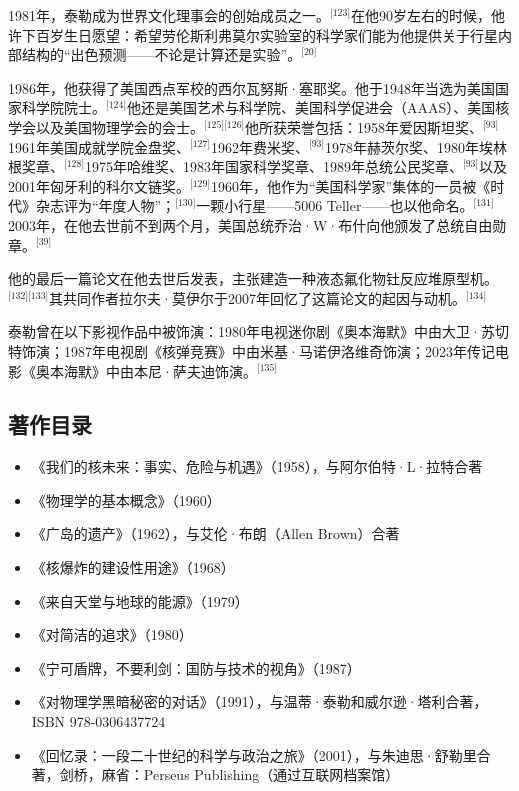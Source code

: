 1981年，泰勒成为世界文化理事会的创始成员之一。\(^\text{[123]}\)在他90岁左右的时候，他许下百岁生日愿望：希望劳伦斯利弗莫尔实验室的科学家们能为他提供关于行星内部结构的“出色预测——不论是计算还是实验”。\(^\text{[20]}\)

1986年，他获得了美国西点军校的西尔瓦努斯·塞耶奖。他于1948年当选为美国国家科学院院士。\(^\text{[124]}\)他还是美国艺术与科学院、美国科学促进会（AAAS）、美国核学会以及美国物理学会的会士。\(^\text{[125][126]}\)他所获荣誉包括：1958年爱因斯坦奖、\(^\text{[93]}\)1961年美国成就学院金盘奖、\(^\text{[127]}\)1962年费米奖、\(^\text{[93]}\)1978年赫茨尔奖、1980年埃林根奖章、\(^\text{[128]}\)1975年哈维奖、1983年国家科学奖章、1989年总统公民奖章、\(^\text{[93]}\)以及2001年匈牙利的科尔文链奖。\(^\text{[129]}\)1960年，他作为“美国科学家”集体的一员被《时代》杂志评为“年度人物”；\(^\text{[130]}\)一颗小行星——5006 Teller——也以他命名。\(^\text{[131]}\)2003年，在他去世前不到两个月，美国总统乔治·W·布什向他颁发了总统自由勋章。\(^\text{[39]}\)

他的最后一篇论文在他去世后发表，主张建造一种液态氟化物钍反应堆原型机。\(^\text{[132][133]}\)其共同作者拉尔夫·莫伊尔于2007年回忆了这篇论文的起因与动机。\(^\text{[134]}\)

泰勒曾在以下影视作品中被饰演：1980年电视迷你剧《奥本海默》中由大卫·苏切特饰演；1987年电视剧《核弹竞赛》中由米基·马诺伊洛维奇饰演；2023年传记电影《奥本海默》中由本尼·萨夫迪饰演。\(^\text{[135]}\)
\subsection{著作目录}
\begin{itemize}
\item 《我们的核未来：事实、危险与机遇》（1958），与阿尔伯特·L·拉特合著
\item 《物理学的基本概念》（1960）
\item 《广岛的遗产》（1962），与艾伦·布朗（Allen Brown）合著
\item 《核爆炸的建设性用途》（1968）
\item 《来自天堂与地球的能源》（1979）
\item 《对简洁的追求》（1980）
\item 《宁可盾牌，不要利剑：国防与技术的视角》（1987）
\item 《对物理学黑暗秘密的对话》（1991），与温蒂·泰勒和威尔逊·塔利合著，ISBN 978-0306437724
\item 《回忆录：一段二十世纪的科学与政治之旅》（2001），与朱迪思·舒勒里合著，剑桥，麻省：Perseus Publishing（通过互联网档案馆）
\end{itemize}
